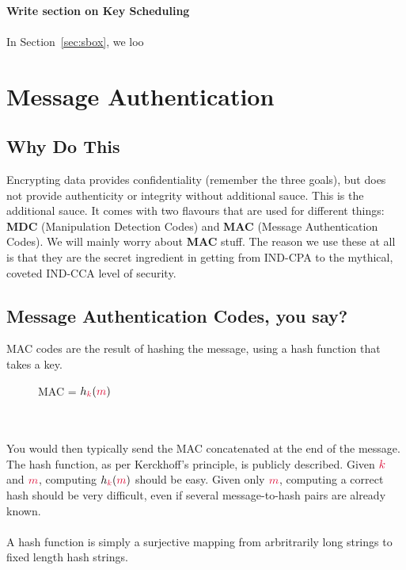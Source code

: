     \\
    \textbf{Write section on Key Scheduling}\\
    \\
    In Section~\ref{sec:sbox}, we loo

\section{Message Authentication}
    \subsection{Why Do This}
        Encrypting data provides confidentiality (remember the three goals), but does not provide authenticity or integrity without additional sauce. This is the additional sauce.
        It comes with two flavours that are used for different things: \textbf{MDC} (Manipulation Detection Codes) and \textbf{MAC} (Message Authentication Codes). We will mainly worry about \textbf{MAC} stuff.
        The reason we use these at all is that they are the secret ingredient in getting from IND-CPA to the mythical, coveted IND-CCA level of security.


    \subsection{\textbf{M}essage \textbf{A}uthentication \textbf{C}odes, you say?}
    MAC codes are the result of hashing the message, using a hash function that takes a key.
    \begin{figure}[htp!]
        \centering
        MAC = $h_{\ck}(\cm)$
    \end{figure}\\
    \\
    You would then typically send the MAC concatenated at the end of the message. The hash function, as per Kerckhoff's principle, is publicly described. Given $\ck$ and $\cm$, computing $h_{\ck}(\cm)$ should be easy.
    Given only $\cm$, computing a correct hash should be very difficult, even if several message-to-hash pairs are already known.\\
    \\
    A hash function is simply a surjective mapping from arbritrarily long strings to fixed length hash strings. \\
    \\
